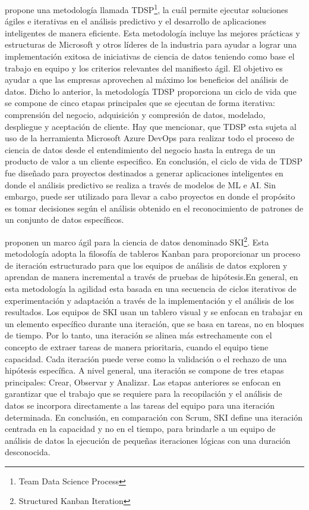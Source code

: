 \citep{Microsoft2022} propone una metodología llamada TDSP\footnote{Team Data Science Process}, la cuál permite ejecutar soluciones ágiles e iterativas en el análisis predictivo y el desarrollo de aplicaciones inteligentes de manera eficiente. Esta metodología incluye las mejores prácticas y estructuras de Microsoft y otros líderes de la industria para ayudar a lograr una implementación exitosa de iniciativas de ciencia de datos teniendo como base el trabajo en equipo y los criterios relevantes del manifiesto ágil. El objetivo es ayudar a que las empresas aprovechen al máximo los beneficios del análisis de datos. Dicho lo anterior, la metodología TDSP proporciona un ciclo de vida que se compone de cinco etapas principales que se ejecutan de forma iterativa: comprensión del negocio, adquisición y compresión de datos, modelado, despliegue y aceptación de cliente. Hay que mencionar, que TDSP esta sujeta al uso de la herramienta Microsoft Azure DevOps para realizar todo el proceso de ciencia de datos desde el entendimiento del negocio hasta la entrega de un producto de valor a un cliente especifico. En conclusión, el ciclo de vida de TDSP fue diseñado para proyectos destinados a generar aplicaciones inteligentes en donde el análisis predictivo se realiza a través de modelos de ML e AI. Sin embargo, puede ser utilizado para llevar a cabo proyectos en donde el propósito es tomar decisiones según el análisis obtenido en el reconocimiento de patrones de un conjunto de datos específicos.

\citep{Saltz2019} proponen un marco ágil para la ciencia de datos denominado SKI\footnote{Structured Kanban Iteration}. Esta metodología adopta la filosofía de tableros Kanban  para proporcionar un proceso de iteración estructurado para que los equipos de análisis de datos exploren y aprendan de manera incremental a través de pruebas de hipótesis.En general, en esta metodología la agilidad esta basada en una secuencia de ciclos iterativos de experimentación y adaptación a través de la implementación y el análisis de los resultados. Los equipos de SKI usan un tablero visual y se enfocan en trabajar en un elemento específico durante una iteración, que se basa en tareas, no en bloques de tiempo. Por lo tanto, una iteración se alinea más estrechamente con el concepto de extraer tareas de manera prioritaria, cuando el equipo tiene capacidad. Cada iteración puede verse como la validación o el rechazo de una hipótesis específica. A nivel general, una iteración se compone de tres etapas principales: Crear, Observar y Analizar. Las etapas anteriores se enfocan en garantizar que el trabajo que se requiere para la recopilación y el análisis de datos se incorpora directamente a las tareas del equipo para una iteración determinada. En conclusión, en comparación con Scrum, SKI define una iteración centrada en la capacidad y no en el tiempo, para brindarle a un equipo de análisis de datos la ejecución de pequeñas iteraciones lógicas con una duración desconocida.

